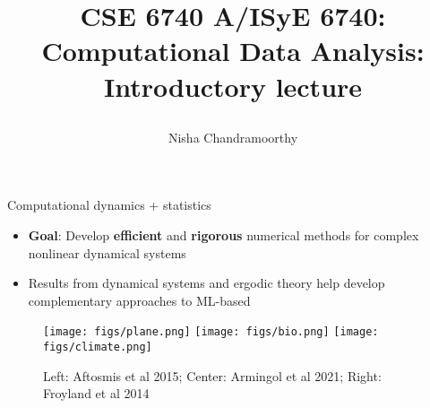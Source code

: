 \documentclass[final]{beamer}
\title{\begin{huge}{CSE 6740 A/ISyE 6740: Computational Data Analysis: Introductory lecture}\end{huge}} %
\author{Nisha Chandramoorthy} %
\newcommand{\highlight}[1]{{\color{burgundy} \textbf{#1}}}
\begin{document}
\frame{\titlepage}

				\begin{frame}{Computational dynamics + statistics}
						\begin{itemize}
								\item \highlight{Goal}: Develop \highlight{efficient} and \highlight{rigorous} numerical methods for complex nonlinear dynamical systems

								\item Results from dynamical systems and ergodic theory help develop complementary approaches to ML-based  
						\end{itemize}
						\pause
						\begin{figure}
						\texttt{[image: figs/plane.png]}
						\texttt{[image: figs/bio.png]}
						\texttt{[image: figs/climate.png]}
								\caption{Left: Aftosmis et al 2015; Center: Armingol et al 2021; Right: Froyland et al 2014}
						\end{figure}
				\end{frame}
\end{document}
